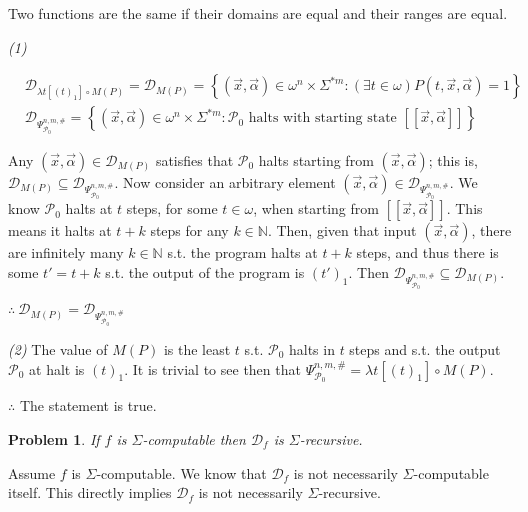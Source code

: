 \documentclass[a4paper, 12pt]{article}
\newtheorem{problem}{Problem}
\newtheorem{problem}{Problem}
\begin{document}
Two functions are the same if their domains are equal and their ranges are
equal.

\textit{(1)} 


\begin{align*}
    &\mathcal{D}_{\lambda t \left[  (t)_1 \right] \circ M(P)} =
    \mathcal{D}_{M(P)} = \left\{ (\vec{x}, \vec{\alpha}) \in \omega^{n} \times
    \Sigma^{*m} : (\exists t \in  \omega) P(t, \vec{x}, \vec{\alpha}) = 1
\right\} \\ 
    &\mathcal{D}_{\Psi_{\mathcal{P}_0}^{n, m, \#}} = \left\{ (\vec{x},
\vec{\alpha}) \in \omega^{n} \times \Sigma^{*m} : \mathcal{P}_0 \text{ halts
with starting state } [\![ \vec{x}, \vec{\alpha} ]\!] \right\} 
\end{align*}

Any $(\vec{x}, \vec{\alpha}) \in \mathcal{D}_{M(P)}$ satisfies that
$\mathcal{P}_0$ halts starting from $(\vec{x}, \vec{\alpha})$; this is,
$\mathcal{D}_{M(P)} \subseteq \mathcal{D}_{\Psi_{\mathcal{P}_0}^{n, m, \#}}$.
Now consider an arbitrary element $(\vec{x}, \vec{\alpha}) \in
\mathcal{D}_{\Psi_{\mathcal{P}_0}^{n, m, \#}}$.  We know $\mathcal{P}_0$ halts
at $t$ steps, for some $t \in \omega$, when starting from $[\![ \vec{x},
\vec{\alpha} ]\!]$. This means it halts at $t + k$ steps for any $k \in
\mathbb{N}$. Then, given that input $(\vec{x}, \vec{\alpha}) $, there are
infinitely many 
$k \in \mathbb{N}$ s.t. the program halts at $t + k$ steps, and thus there is
some $t' = t + k$ s.t. the output of the program is $(t')_1$. Then
$\mathcal{D}_{\Psi_{\mathcal{P}_0}^{n, m, \#}} \subseteq \mathcal{D}_{M(P)}$. 

$\therefore ~ \mathcal{D}_{M(P)} = \mathcal{D}_{\Psi_{\mathcal{P}_0}^{n, m, \#}}$

\textit{(2)} The value of $M(P)$ is the least $t$ s.t. $\mathcal{P}_0$ halts in $t$
steps and s.t. the output $\mathcal{P}_0$ at halt is $(t)_1$. It is trivial to
see then that $\Psi_{\mathcal{P}_0}^{n, m, \#} = \lambda t \left[  (t)_1 \right]
\circ M(P)$.

$\therefore $ The statement is true.

\pagebreak 

\begin{problem}
    If $f$ is $\Sigma$-computable then $\mathcal{D}_f$ is $\Sigma$-recursive.
\end{problem}

Assume $f$ is $\Sigma$-computable. We know that $\mathcal{D}_f$ is not
necessarily $\Sigma$-computable itself. This directly implies $\mathcal{D}_f$ is
not necessarily $\Sigma$-recursive.
\end{document}
